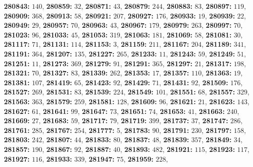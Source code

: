 \textsf{\bfseries 280843:} $140$, \textsf{\bfseries 280859:} $32$, \textsf{\bfseries 280871:} $43$, \textsf{\bfseries 280879:} $244$, \textsf{\bfseries 280883:} $83$, \textsf{\bfseries 280897:} $119$, \textsf{\bfseries 280909:} $368$, \textsf{\bfseries 280913:} $58$, \textsf{\bfseries 280921:} $207$, \textsf{\bfseries 280927:} $176$, \textsf{\bfseries 280933:} $19$, \textsf{\bfseries 280939:} $22$, \textsf{\bfseries 280949:} $29$, \textsf{\bfseries 280957:} $70$, \textsf{\bfseries 280963:} $43$, \textsf{\bfseries 280967:} $179$, \textsf{\bfseries 280979:} $263$, \textsf{\bfseries 280997:} $70$, \textsf{\bfseries 281023:} $96$, \textsf{\bfseries 281033:} $45$, \textsf{\bfseries 281053:} $319$, \textsf{\bfseries 281063:} $181$, \textsf{\bfseries 281069:} $58$, \textsf{\bfseries 281081:} $30$, \textsf{\bfseries 281117:} $71$, \textsf{\bfseries 281131:} $114$, \textsf{\bfseries 281153:} $3$, \textsf{\bfseries 281159:} $211$, \textsf{\bfseries 281167:} $204$, \textsf{\bfseries 281189:} $341$, \textsf{\bfseries 281191:} $364$, \textsf{\bfseries 281207:} $135$, \textsf{\bfseries 281227:} $265$, \textsf{\bfseries 281233:} $11$, \textsf{\bfseries 281243:} $59$, \textsf{\bfseries 281249:} $51$, \textsf{\bfseries 281251:} $11$, \textsf{\bfseries 281273:} $369$, \textsf{\bfseries 281279:} $91$, \textsf{\bfseries 281291:} $365$, \textsf{\bfseries 281297:} $21$, \textsf{\bfseries 281317:} $198$, \textsf{\bfseries 281321:} $70$, \textsf{\bfseries 281327:} $83$, \textsf{\bfseries 281339:} $262$, \textsf{\bfseries 281353:} $17$, \textsf{\bfseries 281357:} $110$, \textsf{\bfseries 281363:} $19$, \textsf{\bfseries 281381:} $107$, \textsf{\bfseries 281419:} $65$, \textsf{\bfseries 281423:} $92$, \textsf{\bfseries 281429:} $71$, \textsf{\bfseries 281431:} $92$, \textsf{\bfseries 281509:} $176$, \textsf{\bfseries 281527:} $269$, \textsf{\bfseries 281531:} $83$, \textsf{\bfseries 281539:} $224$, \textsf{\bfseries 281549:} $101$, \textsf{\bfseries 281551:} $68$, \textsf{\bfseries 281557:} $329$, \textsf{\bfseries 281563:} $363$, \textsf{\bfseries 281579:} $259$, \textsf{\bfseries 281581:} $128$, \textsf{\bfseries 281609:} $96$, \textsf{\bfseries 281621:} $21$, \textsf{\bfseries 281623:} $143$, \textsf{\bfseries 281627:} $61$, \textsf{\bfseries 281641:} $99$, \textsf{\bfseries 281647:} $73$, \textsf{\bfseries 281651:} $74$, \textsf{\bfseries 281653:} $41$, \textsf{\bfseries 281663:} $240$, \textsf{\bfseries 281669:} $27$, \textsf{\bfseries 281683:} $59$, \textsf{\bfseries 281717:} $79$, \textsf{\bfseries 281719:} $399$, \textsf{\bfseries 281737:} $37$, \textsf{\bfseries 281747:} $286$, \textsf{\bfseries 281761:} $285$, \textsf{\bfseries 281767:} $254$, \textsf{\bfseries 281777:} $5$, \textsf{\bfseries 281783:} $90$, \textsf{\bfseries 281791:} $230$, \textsf{\bfseries 281797:} $158$, \textsf{\bfseries 281803:} $242$, \textsf{\bfseries 281807:} $44$, \textsf{\bfseries 281833:} $80$, \textsf{\bfseries 281837:} $48$, \textsf{\bfseries 281839:} $357$, \textsf{\bfseries 281849:} $34$, \textsf{\bfseries 281857:} $190$, \textsf{\bfseries 281867:} $92$, \textsf{\bfseries 281887:} $40$, \textsf{\bfseries 281893:} $482$, \textsf{\bfseries 281921:} $115$, \textsf{\bfseries 281923:} $117$, \textsf{\bfseries 281927:} $116$, \textsf{\bfseries 281933:} $339$, \textsf{\bfseries 281947:} $75$, \textsf{\bfseries 281959:} $228$, 
